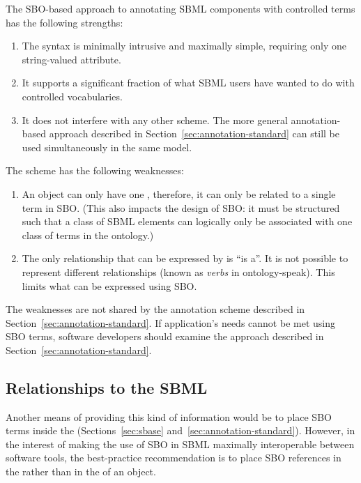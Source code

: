The SBO-based approach to annotating SBML components with
controlled terms has the following strengths:
\begin{enumerate}

\item The syntax is minimally intrusive and maximally simple,
  requiring only one string-valued attribute.

\item It supports a significant fraction of what SBML users have wanted
  to do with controlled vocabularies.

\item It does not interfere with any other scheme.  The more
  general annotation-based approach described in
  Section~\ref{sec:annotation-standard} can still be used
  simultaneously in the same model.

\end{enumerate}

The scheme has the following weaknesses:
\begin{enumerate}

\item An object can only have one  ,
  therefore, it can only be related to a single term in SBO.
  (This also impacts the design of SBO: it must be structured such
  that a class of SBML elements can logically only be associated
  with one class of terms in the ontology.)

\item The only relationship that can be expressed by
   is ``is a''.  It is not possible to represent
  different relationships (known as \emph{verbs} in
  ontology-speak).  This limits what can be expressed using SBO.

\end{enumerate}

The weaknesses are not shared by the annotation scheme described
in Section~\ref{sec:annotation-standard}.  If application's
needs cannot be met using SBO terms, software developers should
examine the approach described in
Section~\ref{sec:annotation-standard}.

\subsection{Relationships to the SBML  }

Another means of providing this kind of information would be to
place SBO terms inside the  
(Sections~\ref{sec:sbase} and~\ref{sec:annotation-standard}).  However, in the interest of making the
use of SBO in SBML maximally interoperable between software tools,
the best-practice recommendation is to place SBO references in the
  rather than in the  
of an object.

